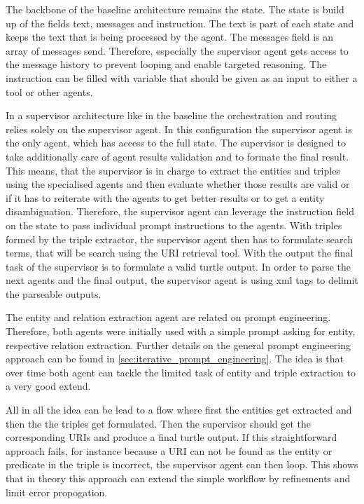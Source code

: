 \documentclass[a4paper,oneside,bibliography=totoc]{scrbook}
\begin{document}
The backbone of the baseline architecture remains the state. The state is build up of the fields text, messages and instruction. The text is part of each state and keeps the text that is being processed by the agent. The messages field is an array of messages send. Therefore, especially the supervisor agent gets access to the message history to prevent looping and enable targeted reasoning. The instruction can be filled with variable that should be given as an input to either a tool or other agents.

In a supervisor architecture like in the baseline the orchestration and routing relies solely on the supervisor agent. In this configuration the supervisor agent is the only agent, which has access to the full state. The supervisor is designed to take additionally care of agent results validation and to formate the final result. This means, that the supervisor is in charge to extract the entities and triples using the specialised agents and then evaluate whether those results are valid or if it has to reiterate with the agents to get better results or to get a entity disambiguation. Therefore, the supervisor agent can leverage the instruction field on the state to pass individual prompt instructions to the agents. With triples formed by the triple extractor, the supervisor agent then has to formulate search terms, that will be search using the URI retrieval tool. With the output the final task of the supervisor is to formulate a valid turtle output. In order to parse the next agents and the final output, the supervisor agent is using xml tags to delimit the parseable outputs.

The entity and relation extraction agent are related on prompt engineering. Therefore, both agents were initially used with a simple prompt asking for entity, respective relation extraction. Further details on the general prompt engineering approach can be found in \ref{sec:iterative_prompt_engineering}. The idea is that over time both agent can tackle the limited task of entity and triple extraction to a very good extend.

All in all the idea can be lead to a flow where first the entities get extracted and then the the triples get formulated. Then the supervisor should get the corresponding URIs and produce a final turtle output. If this straightforward approach fails, for instance because a URI can not be found as the entity or predicate in the triple is incorrect, the supervisor agent can then loop. This shows that in theory this approach can extend the simple workflow by refinements and limit error propogation.
\end{document}
